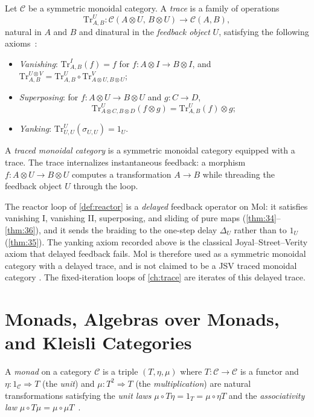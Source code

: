 \begin{definition}
Let $\mathcal{C}$ be a symmetric monoidal category. A \emph{trace} is a
family of operations
\[ \mathrm{Tr}^{U}_{A,B} \colon \mathcal{C} (A \otimes U,\, B \otimes U)
   \to \mathcal{C} (A,B), \]
natural in $A$ and $B$ and dinatural in the \emph{feedback object} $U$,
satisfying the following axioms~\cite{joyalsv, arxiv-traced-monoidal}:
\begin{itemize}
  \item \emph{Vanishing}: $\mathrm{Tr}^{I}_{A,B} (f) = f$ for
        $f \colon A \otimes I \to B \otimes I$, and
        $\mathrm{Tr}^{U \otimes V}_{A,B}
        = \mathrm{Tr}^{U}_{A,B} \circ
          \mathrm{Tr}^{V}_{A \otimes U, B \otimes U}$;
  \item \emph{Superposing}: for $f \colon A \otimes U \to B \otimes U$ and
        $g \colon C \to D$,
        \[ \mathrm{Tr}^{U}_{A \otimes C, B \otimes D} (f \otimes g)
           = \mathrm{Tr}^{U}_{A,B} (f) \otimes g; \]
  \item \emph{Yanking}: $\mathrm{Tr}^{U}_{U,U} (\sigma_{U,U}) = 1_U$.
\end{itemize}
A \emph{traced monoidal category} is a symmetric monoidal category equipped
with a trace. The trace internalizes instantaneous feedback: a morphism
$f \colon A \otimes U \to B \otimes U$ computes a transformation $A \to B$
while threading the feedback object $U$ through the loop.

The reactor loop of \autoref{def:reactor} is a \emph{delayed} feedback
operator on Mol: it satisfies vanishing I, vanishing II, superposing, and
sliding of pure maps (\autoref{thm:34}--\autoref{thm:36}), and it sends
the braiding to the one-step delay $\Delta_U$ rather than to $1_U$
(\autoref{thm:35}). The yanking axiom recorded above is the classical
Joyal--Street--Verity axiom that delayed feedback fails. Mol is therefore
used as a symmetric monoidal category with a delayed trace, and is not
claimed to be a JSV traced monoidal category \citep{joyalsv}. The
fixed-iteration loops of \autoref{ch:trace} are iterates of this delayed
trace.
\end{definition}

\section{Monads, Algebras over Monads, and Kleisli Categories}\label{sec:prelim-monads}

\begin{definition}[Monad]
A \emph{monad} on a category $\mathcal{C}$ is a triple $(T, \eta, \mu)$ where
$T \colon \mathcal{C} \to \mathcal{C}$ is a functor and
$\eta \colon 1_{\mathcal{C}} \Rightarrow T$ (the \emph{unit}) and
$\mu \colon T^2 \Rightarrow T$ (the \emph{multiplication}) are natural
transformations satisfying the \emph{unit laws}
$\mu \circ T\eta = 1_T = \mu \circ \eta T$ and the \emph{associativity law}
$\mu \circ T\mu = \mu \circ \mu T$~\cite{maclane, arxiv-monads-kleisli}.
\end{definition}


